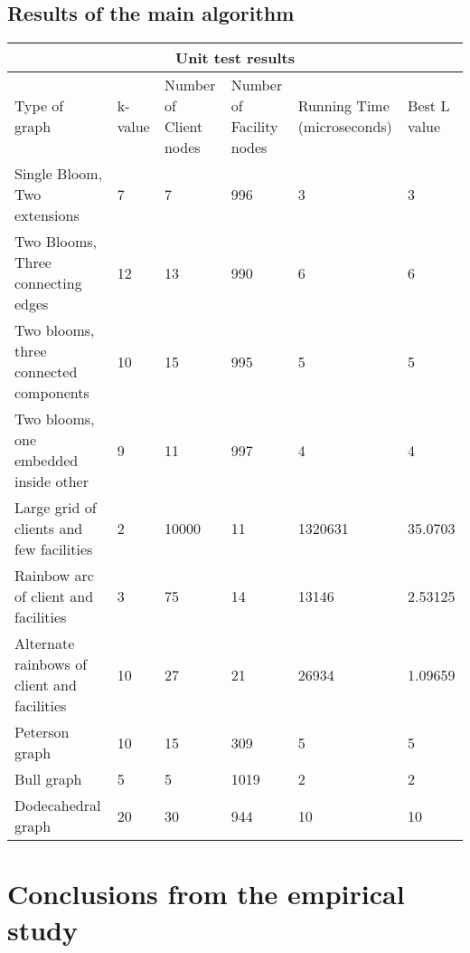 \documentclass[12pt, a4paper]{article}
\begin{document}
{\subsection{Results of the main algorithm}
\begin{longtable}{ |p{2cm}|p{2cm}|p{2cm}|p{2cm}|p{2cm}| p{2cm}|  }
 \hline
 \multicolumn{6}{|c|}{Unit test results} \\
 \hline
Type of graph & k- value & Number of Client nodes &Number of Facility nodes & Running Time (microseconds) & Best L value\\
 \hline
Single Bloom, Two extensions   & 7   &7& 996&3&3  \\\hline
Two Blooms, Three connecting edges   & 12   &13& 990&6&6  \\\hline
Two blooms, three connected components   & 10   &15& 995&5&5  \\\hline
Two blooms, one embedded inside other   & 9   &11& 997&4&4  \\\hline
Large grid of clients and few facilities &2&10000&11&1320631&35.0703 \\\hline
Rainbow arc of client and facilities   & 3  &75& 14&13146&2.53125  \\\hline
Alternate rainbows of client and facilities&10 &27 &21&26934&1.09659  \\\hline
Peterson graph & 10  &15& 309&5&5  \\\hline
Bull graph   & 5   &5& 1019&2&2  \\\hline
Dodecahedral graph   &20  &30 & 944 &10&10  \\\hline

 \hline
\end{longtable}


\section{Conclusions from the empirical study}

}
\end{document}
